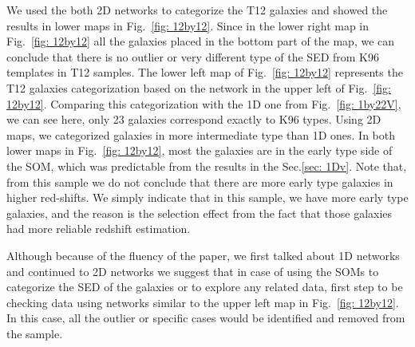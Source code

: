 \documentclass[useAMS,usenatbib]{mn2e}
\begin{document}
    We used the both 2D networks to categorize the T12 galaxies and showed the results in lower maps in Fig.~\ref{fig: 12by12}.
    Since in the lower right map in Fig.~\ref{fig: 12by12} all the galaxies placed in the bottom part of the map, we can conclude that there is no outlier or very different type of the SED from K96 templates in T12 samples.
    The lower left map of Fig.~\ref{fig: 12by12} represents the T12 galaxies categorization based on the network in the upper left of Fig.~\ref{fig: 12by12}. 
    Comparing this categorization with the 1D one from Fig.~\ref{fig: 1by22V}, we can see here, only 23 galaxies correspond exactly to K96 types.
    Using 2D maps, we categorized galaxies in more intermediate type than 1D ones.
    In both lower maps in Fig.~\ref{fig: 12by12}, most the galaxies are in the early type side of the SOM, which was predictable from the results in the Sec.\ref{sec: 1Dv}.
    Note that, from this sample we do not conclude that there are more early type galaxies in higher red-shifts.
    We simply indicate that in this sample, we have more early type galaxies, and the reason is the selection effect from the fact that those galaxies had more reliable redshift estimation. %
    
    Although because of the fluency of the paper, we first talked about 1D networks and continued to 2D networks we suggest that in case of using the SOMs to categorize the SED of the galaxies or to explore any related data, first step to be checking data using networks similar to the upper left map in Fig.~\ref{fig: 12by12}.
    In this case, all the outlier or specific cases would be identified and removed from the sample. 

    
    
    
\end{document}
